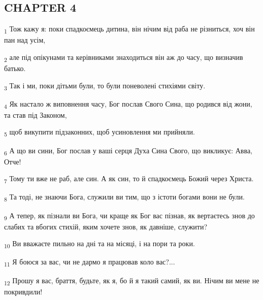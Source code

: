 \subsection{CHAPTER 4}
\begin{tcolorbox}
\textsubscript{1} Тож кажу я: поки спадкоємець дитина, він нічим від раба не різниться, хоч він пан над усім,
\end{tcolorbox}
\begin{tcolorbox}
\textsubscript{2} але під опікунами та керівниками знаходиться він аж до часу, що визначив батько.
\end{tcolorbox}
\begin{tcolorbox}
\textsubscript{3} Так і ми, поки дітьми були, то були поневолені стихіями світу.
\end{tcolorbox}
\begin{tcolorbox}
\textsubscript{4} Як настало ж виповнення часу, Бог послав Свого Сина, що родився від жони, та став під Законом,
\end{tcolorbox}
\begin{tcolorbox}
\textsubscript{5} щоб викупити підзаконних, щоб усиновлення ми прийняли.
\end{tcolorbox}
\begin{tcolorbox}
\textsubscript{6} А що ви сини, Бог послав у ваші серця Духа Сина Свого, що викликує: Авва, Отче!
\end{tcolorbox}
\begin{tcolorbox}
\textsubscript{7} Тому ти вже не раб, але син. А як син, то й спадкоємець Божий через Христа.
\end{tcolorbox}
\begin{tcolorbox}
\textsubscript{8} Та тоді, не знаючи Бога, служили ви тим, що з істоти богами вони не були.
\end{tcolorbox}
\begin{tcolorbox}
\textsubscript{9} А тепер, як пізнали ви Бога, чи краще як Бог вас пізнав, як вертаєтесь знов до слабих та вбогих стихій, яким хочете знов, як давніше, служити?
\end{tcolorbox}
\begin{tcolorbox}
\textsubscript{10} Ви вважаєте пильно на дні та на місяці, і на пори та роки.
\end{tcolorbox}
\begin{tcolorbox}
\textsubscript{11} Я боюся за вас, чи не дармо я працював коло вас?...
\end{tcolorbox}
\begin{tcolorbox}
\textsubscript{12} Прошу я вас, браття, будьте, як я, бо й я такий самий, як ви. Нічим ви мене не покривдили!
\end{tcolorbox}
